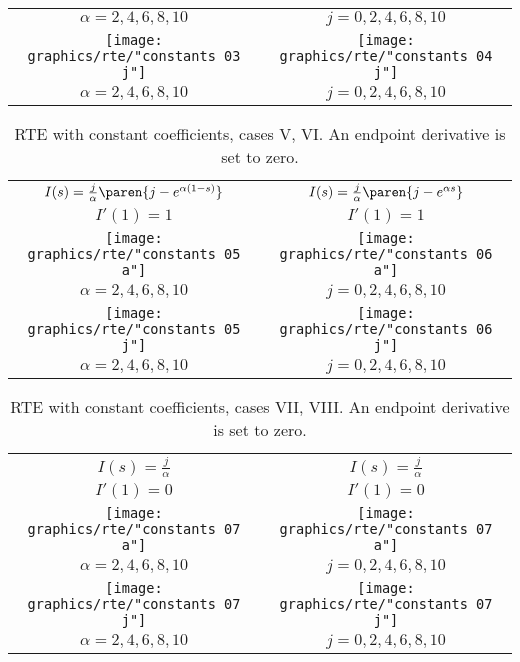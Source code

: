 \begin{landscape}
\begin{table}[htbp]
\begin{center}
\begin{tabular}{cc}
$\alpha = 2, 4, 6, 8, 10$& $j = 0, 2, 4, 6, 8, 10$\\
%
\texttt{[image: graphics/rte/"constants 03 j"]} &
\texttt{[image: graphics/rte/"constants 04 j"]} \\[-12pt]
%
$\alpha = 2, 4, 6, 8, 10$ & $j = 0, 2, 4, 6, 8, 10$\\
%
\end{tabular}
\end{center}
\label{tab:ode:constant:2}
\end{table}
\begin{table}[htbp]
\caption[RTE with constant coefficients, cases V, VI]{RTE with constant coefficients, cases V, VI. An endpoint derivative is set to zero.}
\begin{center}
\begin{tabular}{cc}
%
$I(s) = \frac{j}{\alpha}\paren{j-e^{\alpha(1-s)}}$ & $I(s) = \frac{j}{\alpha}\paren{j-e^{\alpha s}}$ \\[4pt]
%
$I'(1) = 1$ & $I'(1) = 1$ \\
%
\texttt{[image: graphics/rte/"constants 05 a"]} &
\texttt{[image: graphics/rte/"constants 06 a"]} \\[-12pt]
%
$\alpha = 2, 4, 6, 8, 10$& $j = 0, 2, 4, 6, 8, 10$\\
%
\texttt{[image: graphics/rte/"constants 05 j"]} &
\texttt{[image: graphics/rte/"constants 06 j"]} \\[-12pt]
%
$\alpha = 2, 4, 6, 8, 10$ & $j = 0, 2, 4, 6, 8, 10$\\
%
\end{tabular}
\end{center}
\label{tab:ode:constant:3}
\end{table}
\begin{table}[htbp]
\caption[RTE with constant coefficients, cases VII, VIII]{RTE with constant coefficients, cases VII, VIII. An endpoint derivative is set to zero.}
\begin{center}
\begin{tabular}{cc}
%
$I(s) = \frac{j}{\alpha}$ & $I(s) = \frac{j}{\alpha}$ \\[4pt]
%
$I'(1) = 0$ & $I'(1) = 0$ \\
%
\texttt{[image: graphics/rte/"constants 07 a"]} &
\texttt{[image: graphics/rte/"constants 07 a"]} \\[-12pt]
%
$\alpha = 2, 4, 6, 8, 10$& $j = 0, 2, 4, 6, 8, 10$\\
%
\texttt{[image: graphics/rte/"constants 07 j"]} &
\texttt{[image: graphics/rte/"constants 07 j"]} \\[-12pt]
%
$\alpha = 2, 4, 6, 8, 10$ & $j = 0, 2, 4, 6, 8, 10$\\
%
\end{tabular}
\end{center}
\label{tab:ode:constant:4}
\end{table}
%
\end{landscape}
%


